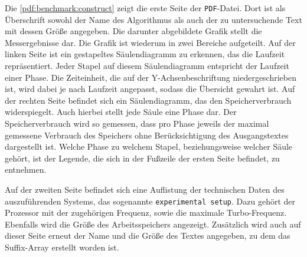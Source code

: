 Die \cref{pdf:benchmark:construct} zeigt die erste Seite der \texttt{PDF}-Datei. Dort ist als Überschrift sowohl der Name des Algorithmus als auch der zu untersuchende Text mit dessen Größe angegeben. Die darunter abgebildete Grafik stellt die Messergebnisse dar. Die Grafik ist wiederum in zwei Bereiche aufgeteilt. Auf der linken Seite ist ein gestapeltes Säulendiagramm zu erkennen, das die Laufzeit repräsentiert. Jeder Stapel auf diesem Säulendiagramm entspricht der Laufzeit einer Phase. Die Zeiteinheit, die auf der Y-Achsenbeschriftung niedergeschrieben ist, wird dabei je nach Laufzeit angepasst, sodass die Übersicht gewahrt ist. Auf der rechten Seite befindet sich ein Säulendiagramm, das den Speicherverbrauch widerspiegelt. Auch hierbei stellt jede Säule eine Phase dar. Der Speicherverbrauch wird so gemessen, dass pro Phase jeweils der maximal gemessene Verbrauch des Speichers ohne Berücksichtigung des Ausgangstextes dargestellt ist. Welche Phase zu welchem Stapel, beziehungsweise welcher Säule gehört, ist der Le\-gen\-de, die sich in der Fußzeile der ersten Seite befindet, zu entnehmen.

Auf der zweiten Seite befindet sich eine Auflistung der tech\-nisch\-en Daten des auszuführenden Systems, das sogenannte \texttt{experimental setup}. Dazu gehört der Prozessor mit der zugehörigen Frequenz, sowie die maximale Turbo-Frequenz. Ebenfalls wird die Größe des Ar\-beits\-spei\-chers angezeigt. Zusätzlich wird auch auf dieser Seite erneut der Name und die Größe des Textes angegeben, zu dem das Suffix-Array erstellt worden ist.